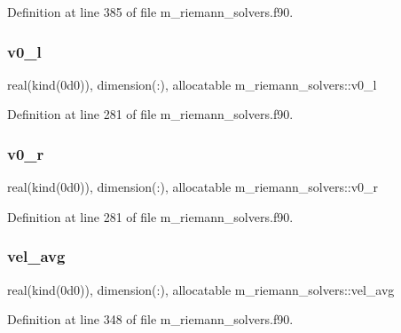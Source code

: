 Definition at line 385 of file m\+\_\+riemann\+\_\+solvers.\+f90.

\mbox{\label{namespacem__riemann__solvers_af425cfd91bc8a567e44b36c9bdbfb2bc}} 
\subsubsection{\texorpdfstring{v0\+\_\+l}{v0\_l}}
{\footnotesize\ttfamily real(kind(0d0)), dimension(\+:), allocatable m\+\_\+riemann\+\_\+solvers\+::v0\+\_\+l}



Definition at line 281 of file m\+\_\+riemann\+\_\+solvers.\+f90.

\mbox{\label{namespacem__riemann__solvers_a1bf4d8c27c1ed947af13b86a63f5b3aa}} 
\subsubsection{\texorpdfstring{v0\+\_\+r}{v0\_r}}
{\footnotesize\ttfamily real(kind(0d0)), dimension(\+:), allocatable m\+\_\+riemann\+\_\+solvers\+::v0\+\_\+r}



Definition at line 281 of file m\+\_\+riemann\+\_\+solvers.\+f90.

\mbox{\label{namespacem__riemann__solvers_a0fd22ed964af8ed09333c72744f561bd}} 
\subsubsection{\texorpdfstring{vel\+\_\+avg}{vel\_avg}}
{\footnotesize\ttfamily real(kind(0d0)), dimension(\+:), allocatable m\+\_\+riemann\+\_\+solvers\+::vel\+\_\+avg}



Definition at line 348 of file m\+\_\+riemann\+\_\+solvers.\+f90.


